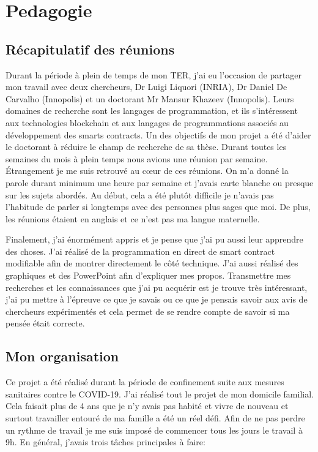 \section{Pedagogie}

\subsection{Récapitulatif des réunions}

Durant la période à plein de temps de mon TER, j'ai eu l'occasion de partager mon travail avec deux chercheurs, 
Dr Luigi Liquori (INRIA), Dr Daniel De Carvalho (Innopolis) et un doctorant Mr Mansur Khazeev (Innopolis).
Leurs domaines de recherche sont les langages de programmation, et ils s'intéressent aux technologies blockchain et
aux langages de programmations associés au développement des smarts contracts.
Un des objectifs de mon projet a été d'aider le doctorant à réduire le champ de recherche de sa thèse. Durant toutes
les semaines du mois à plein temps nous avions une réunion par semaine. Étrangement je me suis retrouvé au cœur de 
ces réunions. On m'a donné la parole durant minimum une heure par semaine et j'avais carte blanche ou presque
sur les sujets abordés.  Au début, cela a été plutôt difficile je n'avais pas l'habitude de parler si longtemps avec
des personnes plus sages que moi. De plus, les réunions étaient en anglais et ce n'est pas ma langue maternelle.

Finalement, j'ai énormément appris et je pense que j'ai pu aussi leur apprendre des choses. J'ai réalisé de la programmation
en direct de smart contract modifiable afin de montrer directement le côté technique. J'ai aussi réalisé des graphiques et des
PowerPoint afin d'expliquer mes propos. Transmettre mes recherches et les connaissances que j'ai pu acquérir est je trouve
très intéressant, j'ai pu mettre à l'épreuve ce que je savais ou ce que je pensais savoir aux avis de chercheurs expérimentés
et cela permet de se rendre compte de savoir si ma pensée était correcte.

\subsection{Mon organisation}

Ce projet a été réalisé durant la période de confinement suite aux mesures sanitaires contre le COVID-19. J'ai réalisé
tout le projet de mon domicile familial. Cela faisait plus de 4 ans que je n'y avais pas habité et vivre de nouveau
et surtout travailler entouré de ma famille a été un réel défi. Afin de ne pas perdre un rythme de travail je me suis imposé
de commencer tous les jours le travail à 9h. En général, j'avais trois tâches principales à faire:

